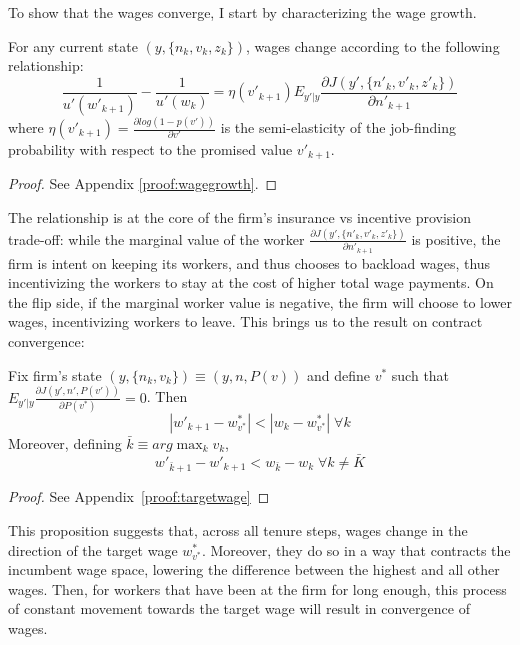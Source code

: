 To show that the wages converge, I start by characterizing the wage growth.
\begin{proposition}
  For any current state $(y,\{n_k,v_k,z_k\})$, wages change according to the following relationship:
\begin{equation} \label{prop:wagegrowth}
    \frac{1}{u'(w'_{k+1})} - \frac{1}{u'(w_k)} = \eta(v'_{k+1}) E_{y'|y} \frac{\partial J(y',\{n'_k,v'_k,z'_k\})}{\partial n'_{k+1}}
\end{equation}
where $\eta(v'_{k+1}) = \frac{\partial log(1-p(v'))}{\partial v'}$ is the semi-elasticity of the job-finding probability with respect to the promised value $v'_{k+1}$.
\end{proposition}
\begin{proof}
  See Appendix \ref{proof:wagegrowth}.
\end{proof}
The relationship is at the core of the firm's insurance vs incentive provision trade-off: while the marginal value of the worker $\frac{\partial J(y',\{n'_k,v'_k,z'_k\})}{\partial n'_{k+1}}$ is positive, the firm is intent on keeping its workers, and thus chooses to backload wages, thus incentivizing the workers to stay at the cost of higher total wage payments. On the flip side, if the marginal worker value is negative, the firm will choose to lower wages, incentivizing workers to leave. This brings us to the result on contract convergence:
\begin{proposition} \label{prop:targetwage}
 Fix firm's state $(y,\{n_k,v_k\})\equiv (y,n,P(v))$ and define $v^*$ such that \\ 
 $E_{y'|y}\frac{\partial J(y',n',P(v'))}{\partial P(v^*)}=0$. Then
  \[ |w'_{k+1}-w^*_{v^*}|<|w_k-w^*_{v^*}| \; \forall k\]
 Moreover, defining $\bar{k}\equiv arg\max_k v_k$,
 \[ w'_{\bar{k}+1}-w'_{k+1}<w_{\bar{k}}-w_k \; \forall k\neq\bar{K}\]
 
\end{proposition}
\begin{proof}
  See Appendix~\ref{proof:targetwage}
\end{proof}
This proposition suggests that, across all tenure steps, wages change in the direction of the target wage $w^*_{v^*}$. Moreover, they do so in a way that contracts the incumbent wage space, lowering the difference between the highest and all other wages. Then, for workers that have been at the firm for long enough, this process of constant movement towards the target wage will result in convergence of wages.
